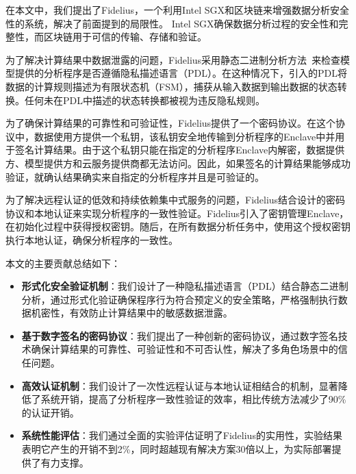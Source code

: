 在本文中，我们提出了Fidelius，一个利用Intel SGX和区块链来增强数据分析安全性的系统，解决了前面提到的局限性。
Intel SGX确保数据分析过程的安全性和完整性，而区块链用于可信的传输、存储和验证。

为了解决计算结果中数据泄露的问题，Fidelius采用静态二进制分析方法~\cite{schulte2019gtirb}来检查模型提供的分析程序是否遵循隐私描述语言（PDL）。在这种情况下，引入的PDL将数据的计算规则描述为有限状态机（FSM），捕获从输入数据到输出数据的状态转换。任何未在PDL中描述的状态转换都被视为违反隐私规则。

为了确保计算结果的可靠性和可验证性，Fidelius提供了一个密码协议。在这个协议中，数据使用方提供一个私钥，该私钥安全地传输到分析程序的Enclave中并用于签名计算结果。由于这个私钥只能在指定的分析程序Enclave内解密，数据提供方、模型提供方和云服务提供商都无法访问。因此，如果签名的计算结果能够成功验证，就确认结果确实来自指定的分析程序并且是可验证的。

为了解决远程认证的低效和持续依赖集中式服务的问题，Fidelius结合设计的密码协议和本地认证来实现分析程序的一致性验证。Fidelius引入了密钥管理Enclave，在初始化过程中获得授权密钥。随后，在所有数据分析任务中，使用这个授权密钥执行本地认证，确保分析程序的一致性。

本文的主要贡献总结如下：
\begin{itemize}
    \item \textbf{形式化安全验证机制}：我们设计了一种隐私描述语言（PDL）结合静态二进制分析，通过形式化验证确保程序行为符合预定义的安全策略，严格强制执行数据机密性，有效防止计算结果中的敏感数据泄露。
    \item \textbf{基于数字签名的密码协议}：我们提出了一种创新的密码协议，通过数字签名技术确保计算结果的可靠性、可验证性和不可否认性，解决了多角色场景中的信任问题。
    \item \textbf{高效认证机制}：我们设计了一次性远程认证与本地认证相结合的机制，显著降低了系统开销，提高了分析程序一致性验证的效率，相比传统方法减少了90\%的认证开销。
    \item \textbf{系统性能评估}：我们通过全面的实验评估证明了Fidelius的实用性，实验结果表明它产生的开销不到2\%，同时超越现有解决方案30倍以上，为实际部署提供了有力支撑。
\end{itemize} 